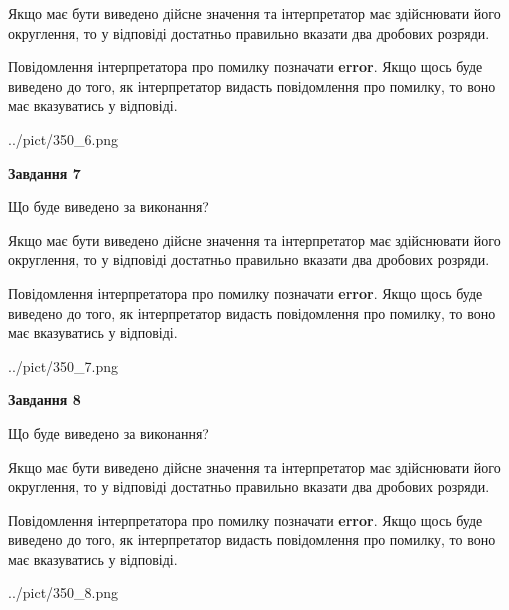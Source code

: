 \documentclass[12pt, ukrainian]{article}
\begin{document}
{\begin {Large}
Якщо має бути виведено дійсне значення та інтерпретатор має здійснювати його округлення, 
то у відповіді достатньо правильно вказати два дробових розряди.

Повідомлення інтерпретатора про помилку позначати \textbf{error}.
Якщо щось буде виведено до того, як інтерпретатор видасть повідомлення про помилку, 
то воно має вказуватись у відповіді. \par

\begin{center}
	{../pict/350_6.png}
\end{center}
\newpage

{\begin {center}\textbf{Завдання 7}\end {center}}\par
Що буде виведено за виконання? \par

Якщо має бути виведено дійсне значення та інтерпретатор має здійснювати його округлення, 
то у відповіді достатньо правильно вказати два дробових розряди.

Повідомлення інтерпретатора про помилку позначати \textbf{error}.
Якщо щось буде виведено до того, як інтерпретатор видасть повідомлення про помилку, 
то воно має вказуватись у відповіді. \par

\begin{center}
	{../pict/350_7.png}
\end{center}
\newpage

{\begin {center}\textbf{Завдання 8}\end {center}}\par
Що буде виведено за виконання? \par

Якщо має бути виведено дійсне значення та інтерпретатор має здійснювати його округлення, 
то у відповіді достатньо правильно вказати два дробових розряди.

Повідомлення інтерпретатора про помилку позначати \textbf{error}.
Якщо щось буде виведено до того, як інтерпретатор видасть повідомлення про помилку, 
то воно має вказуватись у відповіді. \par

\begin{center}
	{../pict/350_8.png}
\end{center}
\newpage


\end{Large}}
\end{document}

